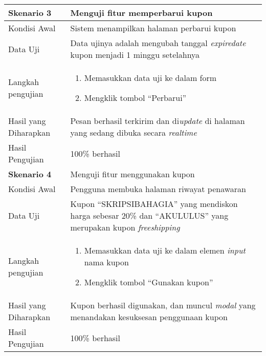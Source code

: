 \begin{longtable}{|X|X|}
		
	\textbf{Skenario 3}
		& Menguji fitur memperbarui kupon \\ \hline
	Kondisi Awal
		& Sistem menampilkan halaman perbarui kupon\\ \hline
	Data Uji
		& Data ujinya adalah mengubah tanggal \textit{expiredate} kupon menjadi 1 minggu setelahnya \\ \hline
	Langkah pengujian
		& \begin{enumerate}
		\item Memasukkan data uji ke dalam form
		\item Mengklik tombol ``Perbarui''
	\end{enumerate} \\ \hline
	Hasil yang Diharapkan
		& Pesan berhasil terkirim dan di\textit{update} di halaman yang sedang dibuka secara \textit{realtime} \\ \hline
	Hasil Pengujian
		& 100\% berhasil \\ \hline		
		
		
	\textbf{Skenario 4}
		& Menguji fitur menggunakan kupon \\ \hline
	Kondisi Awal
		& Pengguna membuka halaman riwayat penawaran\\ \hline
	Data Uji
		& Kupon ``SKRIPSIBAHAGIA'' yang mendiskon harga sebesar 20\% dan ``AKULULUS'' yang merupakan kupon \textit{freeshipping}  \\ \hline
	Langkah pengujian
		& \begin{enumerate}
		\item Memasukkan data uji ke dalam elemen \textit{input} nama kupon
		\item Mengklik tombol ``Gunakan kupon''
	\end{enumerate} \\ \hline
	Hasil yang Diharapkan
		& Kupon berhasil digunakan, dan muncul \textit{modal} yang menandakan kesuksesan penggunaan kupon \\ \hline
	Hasil Pengujian
		& 100\% berhasil \\ \hline	

\end{longtable}